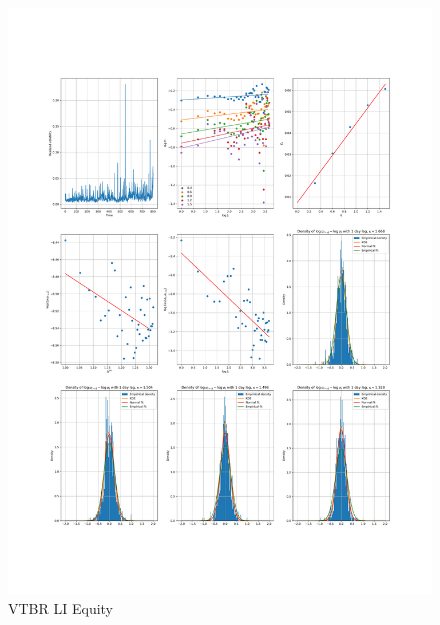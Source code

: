     \begin{figure}[h]
        \includegraphics[width=\textwidth]{fig/VTBR LI Equity.pdf}
        \caption{VTBR LI Equity}
    \end{figure} 
        
